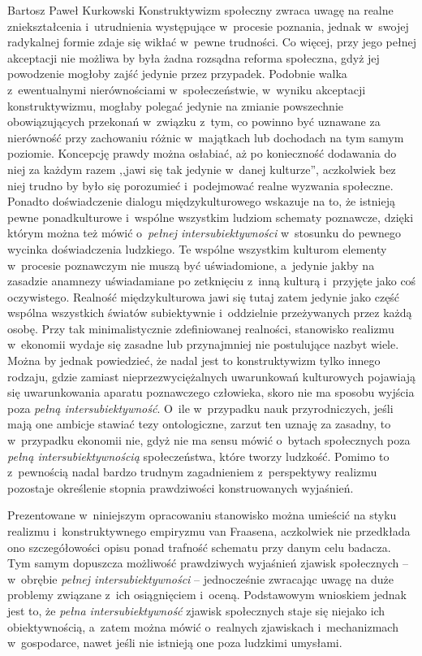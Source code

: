 \begin{artplenv}{Bartosz Paweł Kurkowski}
Konstruktywizm społeczny zwraca uwagę na realne zniekształcenia i~utrudnienia występujące w~procesie poznania,
jednak w~swojej radykalnej formie zdaje się wikłać w~pewne trudności. Co więcej, przy jego pełnej akceptacji nie możliwa by była
żadna rozsądna reforma społeczna, gdyż jej powodzenie mogłoby zajść jedynie przez przypadek. Podobnie
walka z~ewentualnymi nierównościami w~społeczeństwie, w~wyniku akceptacji konstruktywizmu, mogłaby polegać jedynie na zmianie
powszechnie obowiązujących przekonań w~związku z~tym, co powinno być uznawane za nierówność przy zachowaniu
różnic w~majątkach lub dochodach na tym samym poziomie.  Koncepcję prawdy można osłabiać, aż po konieczność dodawania do niej za
każdym razem ,,jawi się tak jedynie w~danej kulturze'', aczkolwiek bez niej trudno by było się porozumieć i~podejmować
realne wyzwania społeczne. Ponadto doświadczenie dialogu międzykulturowego wskazuje na to, że istnieją pewne
ponadkulturowe i~wspólne wszystkim ludziom schematy poznawcze, dzięki którym można też mówić o~\textit{pełnej
intersubiektywności} w~stosunku do pewnego wycinka doświadczenia ludzkiego. Te wspólne wszystkim kulturom
elementy w~procesie poznawczym nie muszą być uświadomione, a~jedynie jakby na zasadzie anamnezy uświadamiane po zetknięciu z~inną
kulturą i~przyjęte jako coś oczywistego. Realność międzykulturowa jawi się tutaj zatem jedynie jako część wspólna
wszystkich światów subiektywnie i~oddzielnie przeżywanych przez każdą osobę. Przy tak minimalistycznie zdefiniowanej
realności, stanowisko realizmu w~ekonomii wydaje się zasadne lub przynajmniej nie postulujące nazbyt wiele. Można by
jednak powiedzieć, że nadal jest to konstruktywizm tylko innego rodzaju, gdzie zamiast nieprzezwyciężalnych uwarunkowań
kulturowych pojawiają się uwarunkowania aparatu poznawczego człowieka, skoro nie ma sposobu wyjścia poza \textit{pełną
intersubiektywność}. O~ile w~przypadku nauk przyrodniczych, jeśli mają one ambicje stawiać tezy ontologiczne, zarzut
ten uznaję za zasadny, to w~przypadku ekonomii nie, gdyż nie ma sensu mówić o~bytach społecznych poza \textit{pełną
intersubiektywnością} społeczeństwa, które tworzy ludzkość. Pomimo to z~pewnością nadal bardzo trudnym
zagadnieniem z~perspektywy realizmu pozostaje określenie stopnia prawdziwości konstruowanych wyjaśnień.


Prezentowane w~niniejszym opracowaniu stanowisko można umieścić na styku realizmu i~konstruktywnego empiryzmu van
Fraasena, aczkolwiek nie przedkłada ono szczegółowości opisu ponad trafność schematu przy danym celu badacza. Tym samym
dopuszcza możliwość prawdziwych wyjaśnień zjawisk społecznych -- w~obrębie
\textit{pełnej intersubiektywności} -- jednocześnie zwracając uwagę na duże problemy
związane z~ich osiągnięciem i~oceną. Podstawowym wnioskiem jednak jest
to, że \textit{pełna intersubiektywność }zjawisk społecznych staje się niejako ich obiektywnością, a~zatem można mówić
o~realnych zjawiskach i~mechanizmach w~gospodarce, nawet jeśli nie istnieją one poza ludzkimi umysłami.


\end{artplenv}
